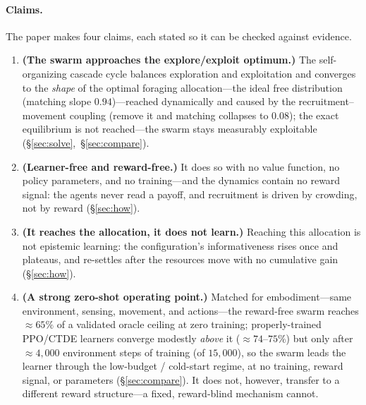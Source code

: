 \documentclass{article}
\begin{document}
\paragraph{Claims.} The paper makes four claims, each stated so it can be checked against evidence.
\begin{enumerate}\setlength\itemsep{2pt}
  \item \textbf{(The swarm approaches the explore/exploit optimum.)} The self-organizing cascade cycle
        balances exploration and exploitation and converges to the \emph{shape} of the optimal foraging
        allocation---the ideal free distribution (matching slope $0.94$)---reached dynamically and caused by the
        recruitment--movement coupling (remove it and matching collapses to $0.08$); the exact equilibrium is
        not reached---the swarm stays measurably exploitable (\S\ref{sec:solve},~\S\ref{sec:compare}).
  \item \textbf{(Learner-free and reward-free.)} It does so with no value function, no policy parameters, and
        no training---and the dynamics contain no reward signal: the agents never read a payoff, and
        recruitment is driven by crowding, not by reward (\S\ref{sec:how}).
  \item \textbf{(It reaches the allocation, it does not learn.)} Reaching this allocation is not epistemic
        learning: the configuration's informativeness rises once and plateaus, and re-settles after the
        resources move with no cumulative gain (\S\ref{sec:how}).
  \item \textbf{(A strong zero-shot operating point.)} Matched for embodiment---same environment, sensing,
        movement, and actions---the reward-free swarm reaches ${\approx}65\%$ of a validated oracle ceiling at
        zero training; properly-trained PPO/CTDE learners converge modestly \emph{above} it (${\approx}74$--$75\%$)
        but only after ${\approx}4{,}000$ environment steps of training (of $15{,}000$), so the swarm leads the
        learner through the low-budget / cold-start regime, at no training, reward signal, or parameters
        (\S\ref{sec:compare}). It
        does not, however, transfer to a different reward structure---a fixed, reward-blind mechanism cannot.
\end{enumerate}
\end{document}
